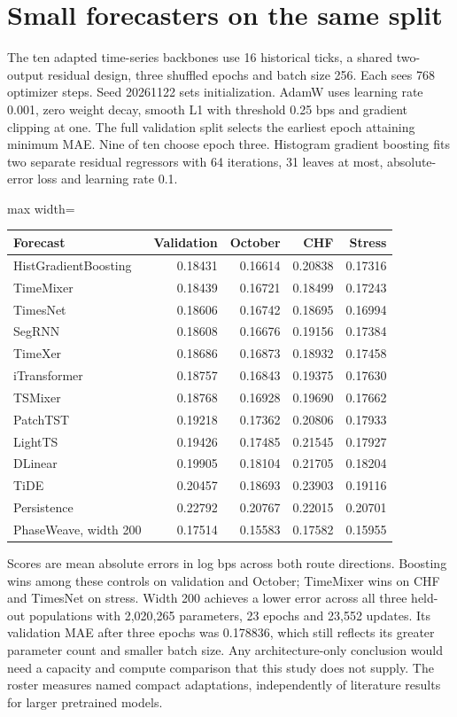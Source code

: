 \documentclass[11pt,oneside,openany]{book}
\begin{document}
\section*{Small forecasters on the same split}
The ten adapted time-series backbones use 16 historical ticks, a shared two-output residual design, three shuffled epochs and batch size 256. Each sees 768 optimizer steps. Seed 20261122 sets initialization. AdamW uses learning rate 0.001, zero weight decay, smooth L1 with threshold 0.25 bps and gradient clipping at one. The full validation split selects the earliest epoch attaining minimum MAE. Nine of ten choose epoch three. Histogram gradient boosting fits two separate residual regressors with 64 iterations, 31 leaves at most, absolute-error loss and learning rate 0.1.

\begin{center}\footnotesize\sffamily\setlength{\tabcolsep}{3.5pt}\renewcommand{\arraystretch}{1.2}
\begin{adjustbox}{max width=\linewidth}\begin{tabular}{@{}lrrrr@{}}\toprule
Forecast & Validation & October & CHF & Stress \\ \midrule
HistGradientBoosting & 0.18431 & 0.16614 & 0.20838 & 0.17316 \\
TimeMixer & 0.18439 & 0.16721 & 0.18499 & 0.17243 \\
TimesNet & 0.18606 & 0.16742 & 0.18695 & 0.16994 \\
SegRNN & 0.18608 & 0.16676 & 0.19156 & 0.17384 \\
TimeXer & 0.18686 & 0.16873 & 0.18932 & 0.17458 \\
iTransformer & 0.18757 & 0.16843 & 0.19375 & 0.17630 \\
TSMixer & 0.18768 & 0.16928 & 0.19690 & 0.17662 \\
PatchTST & 0.19218 & 0.17362 & 0.20806 & 0.17933 \\
LightTS & 0.19426 & 0.17485 & 0.21545 & 0.17927 \\
DLinear & 0.19905 & 0.18104 & 0.21705 & 0.18204 \\
TiDE & 0.20457 & 0.18693 & 0.23903 & 0.19116 \\
Persistence & 0.22792 & 0.20767 & 0.22015 & 0.20701 \\
PhaseWeave, width 200 & 0.17514 & 0.15583 & 0.17582 & 0.15955 \\
\bottomrule\end{tabular}\end{adjustbox}\end{center}
Scores are mean absolute errors in log bps across both route directions. Boosting wins among these controls on validation and October; TimeMixer wins on CHF and TimesNet on stress. Width 200 achieves a lower error across all three held-out populations with 2,020,265 parameters, 23 epochs and 23,552 updates. Its validation MAE after three epochs was 0.178836, which still reflects its greater parameter count and smaller batch size. Any architecture-only conclusion would need a capacity and compute comparison that this study does not supply. The roster measures named compact adaptations, independently of literature results for larger pretrained models.
\end{document}
